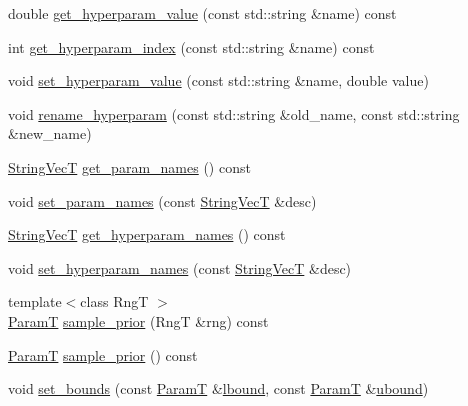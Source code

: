 \begin{DoxyCompactItemize}
\item 
double \hyperlink{classmappel_1_1PointEmitterModel_a3282cc59d5c6010a51f671ba72997705}{get\+\_\+hyperparam\+\_\+value} (const std\+::string \&name) const 
\item 
int \hyperlink{classmappel_1_1PointEmitterModel_ae13aa99689266d870b659d1045d595f1}{get\+\_\+hyperparam\+\_\+index} (const std\+::string \&name) const 
\item 
void \hyperlink{classmappel_1_1PointEmitterModel_ade3e56cc00c43e9b7a521d8c4778d3b7}{set\+\_\+hyperparam\+\_\+value} (const std\+::string \&name, double value)
\item 
void \hyperlink{classmappel_1_1PointEmitterModel_a447c83f0769e6dea2bfad68d957287d0}{rename\+\_\+hyperparam} (const std\+::string \&old\+\_\+name, const std\+::string \&new\+\_\+name)
\item 
\hyperlink{namespacemappel_aae88cf18bccfbb789a6019bcfbbfca68}{String\+VecT} \hyperlink{classmappel_1_1PointEmitterModel_aa910d1137d808041c0601f2dd3db96f0}{get\+\_\+param\+\_\+names} () const 
\item 
void \hyperlink{classmappel_1_1PointEmitterModel_a2abccbca47fc60700d73244e6c4dbe30}{set\+\_\+param\+\_\+names} (const \hyperlink{namespacemappel_aae88cf18bccfbb789a6019bcfbbfca68}{String\+VecT} \&desc)
\item 
\hyperlink{namespacemappel_aae88cf18bccfbb789a6019bcfbbfca68}{String\+VecT} \hyperlink{classmappel_1_1PointEmitterModel_a1b8bbd4bdddfb8f5236e8e50fe546c36}{get\+\_\+hyperparam\+\_\+names} () const 
\item 
void \hyperlink{classmappel_1_1PointEmitterModel_a6cdba258bda50cff162dc16a49383bb0}{set\+\_\+hyperparam\+\_\+names} (const \hyperlink{namespacemappel_aae88cf18bccfbb789a6019bcfbbfca68}{String\+VecT} \&desc)
\item 
{\footnotesize template$<$class RngT $>$ }\\\hyperlink{classmappel_1_1PointEmitterModel_a665ec6aea3aac139bb69a23c06d4b9a1}{ParamT} \hyperlink{classmappel_1_1PointEmitterModel_ae69bf3df2c94b351015bbf81e52dfe03}{sample\+\_\+prior} (RngT \&rng) const 
\item 
\hyperlink{classmappel_1_1PointEmitterModel_a665ec6aea3aac139bb69a23c06d4b9a1}{ParamT} \hyperlink{classmappel_1_1PointEmitterModel_abd9d2923ca9a838897a9b26bfb3ce073}{sample\+\_\+prior} () const 
\item 
void \hyperlink{classmappel_1_1PointEmitterModel_a31f139d9eb58f210f3359a9f5be9dd15}{set\+\_\+bounds} (const \hyperlink{classmappel_1_1PointEmitterModel_a665ec6aea3aac139bb69a23c06d4b9a1}{ParamT} \&\hyperlink{classmappel_1_1PointEmitterModel_a889bc82f74cfa654da121e5770296ab2}{lbound}, const \hyperlink{classmappel_1_1PointEmitterModel_a665ec6aea3aac139bb69a23c06d4b9a1}{ParamT} \&\hyperlink{classmappel_1_1PointEmitterModel_a35b883e84b6a2e0093bdf482c623beef}{ubound})

\end{DoxyCompactItemize}
